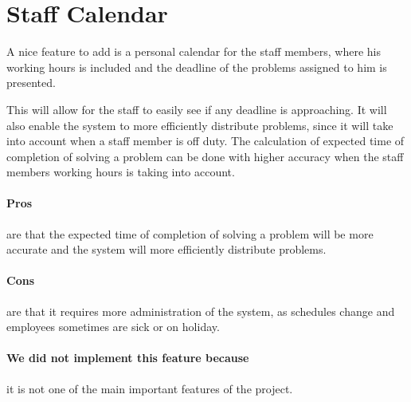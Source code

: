 \section{Staff Calendar}
\label{sec:staffCalendar}
A nice feature to add is a personal calendar for the staff members, where his working hours is included and the deadline of the problems assigned to him is presented. 

This will allow for the staff to easily see if any deadline is approaching. 
It will also enable the system to more efficiently distribute problems, since it will take into account when a staff member is off duty. 
The calculation of expected time of completion of solving a problem can be done with higher accuracy when the staff members working hours is taking into account. 

\paragraph{Pros} are that the expected time of completion of solving a problem will be more accurate and the system will more efficiently distribute problems.
\paragraph{Cons} are that it requires more administration of the system, as schedules change and employees sometimes are sick or on holiday.
\paragraph{We did not implement this feature because} it is not one of the main important features of the project.